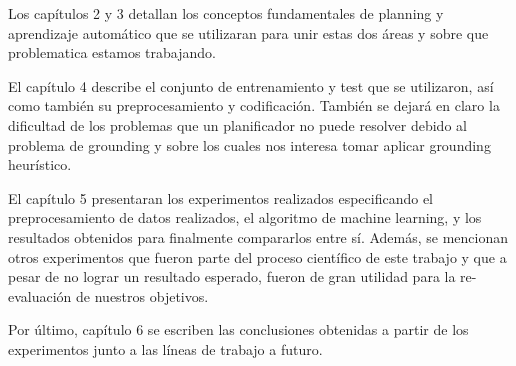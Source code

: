 Los capítulos 2 y 3 detallan los conceptos fundamentales de planning y
aprendizaje automático que se utilizaran para unir estas dos áreas y sobre que
problematica estamos trabajando.

El capítulo 4 describe el conjunto de entrenamiento y test que se utilizaron,
así como también su preprocesamiento y codificación. También se dejará en claro
la dificultad de los problemas que un planificador no puede resolver debido al
problema de grounding y sobre los cuales nos interesa tomar aplicar grounding
heurístico.

El capítulo 5 presentaran los experimentos realizados especificando el
preprocesamiento de datos realizados, el algoritmo de machine learning, y los
resultados obtenidos para finalmente compararlos entre sí. Además, se mencionan
otros experimentos que fueron parte del proceso científico de este trabajo y que
a pesar de no lograr un resultado esperado, fueron de gran utilidad para la
re-evaluación de nuestros objetivos.

Por último, capítulo 6 se escriben las conclusiones obtenidas a partir de los
experimentos junto a las líneas de trabajo a futuro.